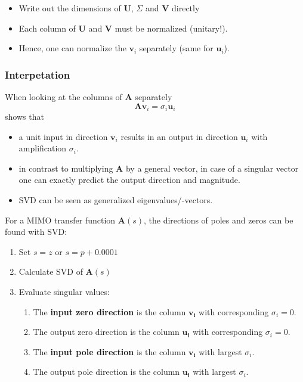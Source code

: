 
\begin{itemize}
    \item Write out the dimensions of $\mathbf{U}$, $\Sigma$ and $\mathbf{V}$ directly
    \item Each column of $\mathbf{U}$ and $\mathbf{V}$ must be normalized (unitary!).
    \item Hence, one can normalize the $\mathbf{v}_i$ separately (same for $\mathbf{u}_i$).
\end{itemize}

\subsubsection{Interpetation}
When looking at the columns of $\mathbf{A}$ separately
\noindent\begin{equation*}
    \mathbf{Av}_i=\sigma_i \mathbf{u}_i
\end{equation*}
shows that
\begin{itemize}
    \item a unit input in direction $\mathbf{v}_i$ results in an output in direction $\mathbf{u}_i$ with amplification $\sigma_i$.
    \item in contrast to multiplying $\mathbf{A}$ by a general vector, in case of a singular vector one can exactly predict the output direction and magnitude.
    \item SVD can be seen as generalized eigenvalues/-vectors.
\end{itemize}

\newpar{}

For a MIMO transfer function $\mathbf{A}(s)$, the directions of poles and zeros can be found with SVD:
\begin{enumerate}
    \item Set $s=z$ or $s=p+0.0001$
    \item Calculate SVD of $\mathbf{A}(s)$
    \item Evaluate singular values:
          \begin{enumerate}
              \item The \textbf{input zero direction} is the column $\mathbf{v_i}$ with corresponding $\sigma_i=0$.
              \item The output zero direction is the column $\mathbf{u_i}$ with corresponding $\sigma_i=0$.
              \item The \textbf{input pole direction} is the column $\mathbf{v_i}$ with largest $\sigma_i$.
              \item The output pole direction is the column $\mathbf{u_i}$ with largest $\sigma_i$.
          \end{enumerate}
\end{enumerate}

